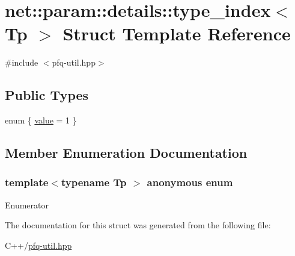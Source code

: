 \hypertarget{structnet_1_1param_1_1details_1_1type__index_3_01Tp_01_4}{\section{net\-:\-:param\-:\-:details\-:\-:type\-\_\-index$<$ Tp $>$ Struct Template Reference}
\label{structnet_1_1param_1_1details_1_1type__index_3_01Tp_01_4}
}


{\ttfamily \#include $<$pfq-\/util.\-hpp$>$}

\subsection*{Public Types}
\begin{DoxyCompactItemize}
\item 
enum \{ \hyperlink{structnet_1_1param_1_1details_1_1type__index_3_01Tp_01_4_aff936ccbc5e8aac0a2398fabfb58cb55a46105c210f804e7866c782cdd2f1c8c9}{value} = 1
 \}
\end{DoxyCompactItemize}


\subsection{Member Enumeration Documentation}
\hypertarget{structnet_1_1param_1_1details_1_1type__index_3_01Tp_01_4_aff936ccbc5e8aac0a2398fabfb58cb55}{\subsubsection[{anonymous enum}]{\setlength{\rightskip}{0pt plus 5cm}template$<$typename Tp $>$ anonymous enum}}\label{structnet_1_1param_1_1details_1_1type__index_3_01Tp_01_4_aff936ccbc5e8aac0a2398fabfb58cb55}
\begin{Desc}
\item[Enumerator]\par
\begin{description}
\item[{\em 
\hypertarget{structnet_1_1param_1_1details_1_1type__index_3_01Tp_01_4_aff936ccbc5e8aac0a2398fabfb58cb55a46105c210f804e7866c782cdd2f1c8c9}{value}\label{structnet_1_1param_1_1details_1_1type__index_3_01Tp_01_4_aff936ccbc5e8aac0a2398fabfb58cb55a46105c210f804e7866c782cdd2f1c8c9}
}]\end{description}
\end{Desc}


The documentation for this struct was generated from the following file\-:\begin{DoxyCompactItemize}
\item 
C++/\hyperlink{pfq-util_8hpp}{pfq-\/util.\-hpp}\end{DoxyCompactItemize}
